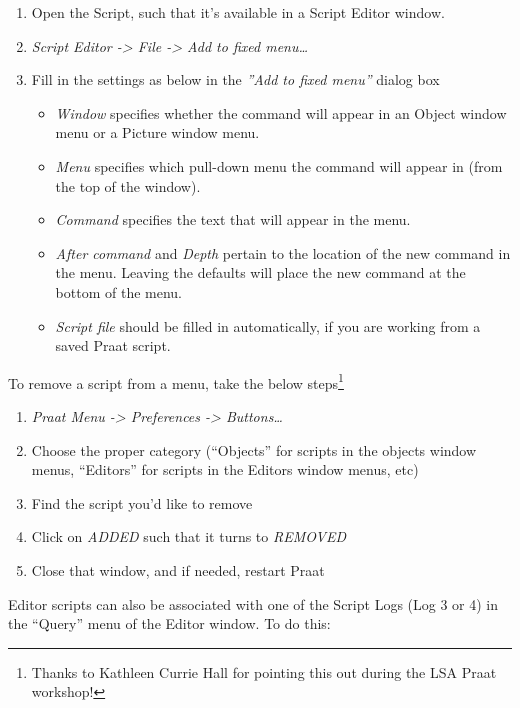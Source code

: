 \begin{enumerate}
\def\labelenumi{\arabic{enumi}.}
\tightlist
\item
  Open the Script, such that it's available in a Script Editor window.
\item
  \emph{Script Editor -\textgreater{} File -\textgreater{} Add to fixed
  menu\ldots{}}
\item
  Fill in the settings as below in the \emph{''Add to fixed menu''}
  dialog box

  \begin{itemize}
  \tightlist
  \item
    \emph{Window} specifies whether the command will appear in an Object
    window menu or a Picture window menu.
  \item
    \emph{Menu} specifies which pull-down menu the command will appear
    in (from the top of the window).
  \item
    \emph{Command} specifies the text that will appear in the menu.
  \item
    \emph{After command} and \emph{Depth} pertain to the location of the
    new command in the menu. Leaving the defaults will place the new
    command at the bottom of the menu.
  \item
    \emph{Script file} should be filled in automatically, if you are
    working from a saved Praat script.
  \end{itemize}
\end{enumerate}

To remove a script from a menu, take the below
steps\footnote{Thanks to Kathleen Currie Hall for pointing this out during the LSA Praat workshop!}

\begin{enumerate}
\def\labelenumi{\arabic{enumi}.}
\tightlist
\item
  \emph{Praat Menu -\textgreater{} Preferences -\textgreater{}
  Buttons\ldots{}}
\item
  Choose the proper category (``Objects'' for scripts in the objects
  window menus, ``Editors'' for scripts in the Editors window menus,
  etc)
\item
  Find the script you'd like to remove
\item
  Click on \emph{ADDED} such that it turns to \emph{REMOVED}
\item
  Close that window, and if needed, restart Praat
\end{enumerate}

Editor scripts can also be associated with one of the Script Logs (Log 3
or 4) in the ``Query'' menu of the Editor window. To do this:

